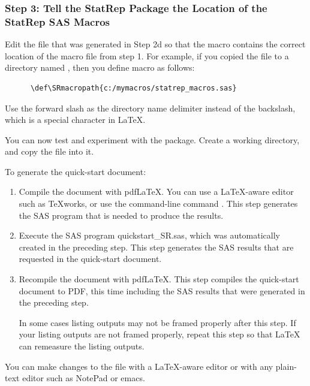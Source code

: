 \documentclass[article,oneside]{memoir}
\begin{document}
\subsubsection{Step 3: Tell the StatRep Package the Location of the StatRep SAS Macros}

   Edit the  file that was generated in Step 2d so that the macro
    contains
   the correct location of the macro file from step 1. For example, if
   you copied the  file to a directory named
   ,
   then you define macro  as follows:
   \begin{verbatim}
      \def\SRmacropath{c:/mymacros/statrep_macros.sas}
   \end{verbatim}

   Use the forward slash
   as the directory name delimiter instead of the backslash, which is a special
   character in LaTeX.

   You can now test and experiment with the package. Create a working
   directory, and copy the file  into it.

   To generate the quick-start document:
\begin{enumerate}
\item Compile the document with pdf\LaTeX. You can use a \LaTeX-aware
      editor such as \TeX works, or use the command-line command .
      This step generates the SAS program that is needed to produce the results.

\item Execute the SAS program quickstart\_SR.sas, which was automatically
      created in the preceding step. This step generates the SAS
      results that are requested in the quick-start document.


\item Recompile the document with pdf\LaTeX. This step compiles the
      quick-start document to PDF, this time including the SAS results
      that were generated in the preceding step.

      In some cases listing outputs may not be framed properly after this step.
      If your listing outputs are not framed properly, repeat this step so that
      LaTeX can remeasure the listing outputs.

\end{enumerate}
   You can make changes to the file with a \LaTeX-aware editor
   or with any plain-text editor such as \textsf{NotePad} or \textsf{emacs}.
\end{document}

